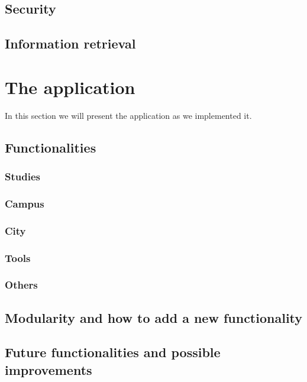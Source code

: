 \documentclass[12pt]{article} %
\begin{document}
\subsection{Security}

\subsection{Information retrieval}
\newpage

\section{The application}

In this section we will present the application as we implemented it.

\subsection{Functionalities}

\subsubsection{Studies}

\subsubsection{Campus}

\subsubsection{City}

\subsubsection{Tools}

\subsubsection{Others}


\subsection{Modularity and how to add a new functionality}

\subsection{Future functionalities and possible improvements}
\end{document}
